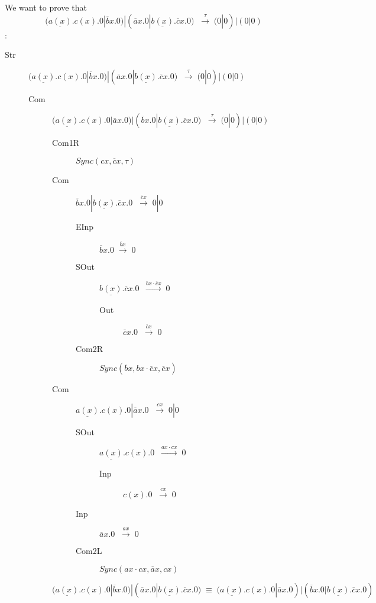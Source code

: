 \begin{example}
  We want to prove that 
  \[
    (\underline{a(x)}.c(x).0|\overline{b}x.0)|(\overline{a}x.0|\underline{b(x)}.\overline{c}x.0)\;
      \;\xrightarrow{\tau}\; 
	(0|0)|(0|0)
  \]:
  \begin{description}
    \item[Str]
      $(\underline{a(x)}.c(x).0|\overline{b}x.0)|(\overline{a}x.0|\underline{b(x)}.\overline{c}x.0)\;
	\;\xrightarrow{\tau}\; 
	  (0|0)|(0|0)$
      \begin{description}
	\item[Com] 
	  $(\underline{a(x)}.c(x).0|\overline{a}x.0)|(\overline{b}x.0|\underline{b(x)}.\overline{c}x.0)\;
	    \;\xrightarrow{\tau}\;
	      (0|0)|(0|0)$
	  \begin{description}
	    \item[Com1R]
	      $Sync(cx, \overline{c}x, \tau)$
	    \item[Com]
	      $\overline{b}x.0|\underline{b(x)}.\overline{c}x.0\;
		\;\xrightarrow{\overline{c}x}\;
		  0|0$
	      \begin{description}
		\item[EInp]
		  $\overline{b}x.0
		    \;\xrightarrow{\overline{b}x}\;
		      0$
		\item[SOut]
		  $\underline{b(x)}.\overline{c}x.0\;
		    \;\xrightarrow{bx\cdot \overline{c}x}\;
		      0$
		  \begin{description}
		    \item[Out]
		      $\overline{c}x.0\;
			\;\xrightarrow{\overline{c}x}\;
			  0$
		  \end{description}
		\item[Com2R]
		  $Sync(\overline{b}x,bx\cdot \overline{c}x,\overline{c}x)$
	      \end{description}
	    \item[Com]
	      $\underline{a(x)}.c(x).0|\overline{a}x.0\;
		\;\xrightarrow{cx}\;
		  0|0$
	      \begin{description}
		\item[SOut]
		  $\underline{a(x)}.c(x).0\;
		    \;\xrightarrow{ax\cdot cx}\;
		      0$
		  \begin{description}
		    \item[Inp]
		      $c(x).0\;
			\;\xrightarrow{cx}\;
			  0$
		  \end{description}
		\item[Inp]
		  $\overline{a}x.0\;
		    \;\xrightarrow{ax}\;
		      0$
		\item[Com2L]
		  $Sync(ax\cdot cx, \overline{a}x, cx)$
	      \end{description}
	  \end{description}
	\item[]
	  $(\underline{a(x)}.c(x).0|\overline{b}x.0)|(\overline{a}x.0|\underline{b(x)}.\overline{c}x.0)\;
	    \equiv\;
	      (\underline{a(x)}.c(x).0|\overline{a}x.0)|(\overline{b}x.0|\underline{b(x)}.\overline{c}x.0)$
      \end{description}
  \end{description}
\end{example}



